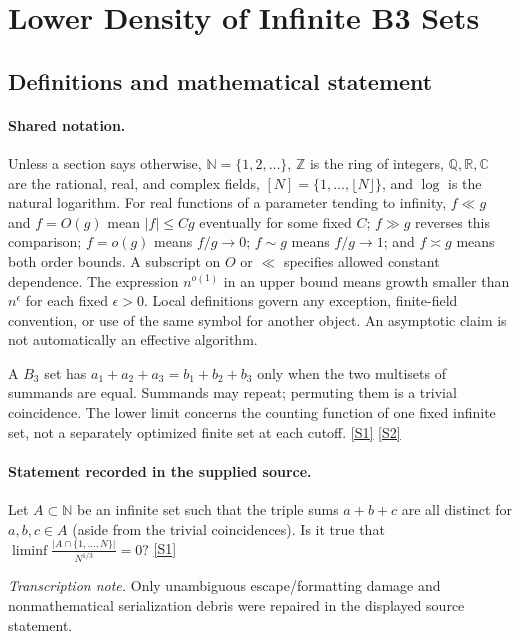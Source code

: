 \documentclass[11pt,a4paper]{article}
\newcommand{\N}{\mathbb{N}}
\newcommand{\Z}{\mathbb{Z}}
\newcommand{\Q}{\mathbb{Q}}
\newcommand{\R}{\mathbb{R}}
\newcommand{\C}{\mathbb{C}}
\newcommand{\sref}[2]{\hyperlink{source:#1:#2}{[S#2]}}
\begin{document}
\section{Lower Density of Infinite B3 Sets}\label{statement}


\subsection{Definitions and mathematical statement}

\paragraph{Shared notation.}Unless a section says otherwise, $\N=\{1,2,\ldots\}$,
$\Z$ is the ring of integers, $\Q,\R,\C$ are the rational, real, and complex
fields, $[N]=\{1,\ldots,\lfloor N\rfloor\}$, and $\log$ is the natural
logarithm. For real functions of a parameter tending to infinity,
$f\ll g$ and $f=O(g)$ mean $|f|\leq Cg$ eventually for some fixed $C$;
$f\gg g$ reverses this comparison; $f=o(g)$ means $f/g\to0$;
$f\sim g$ means $f/g\to1$; and $f\asymp g$ means both order bounds.
A subscript on $O$ or $\ll$ specifies allowed constant dependence.
The expression $n^{o(1)}$ in an upper bound means growth smaller than
$n^\epsilon$ for each fixed $\epsilon>0$. Local definitions govern any
exception, finite-field convention, or use of the same symbol for another
object. An asymptotic claim is not automatically an effective algorithm.



A $B_3$ set has $a_1+a_2+a_3=b_1+b_2+b_3$ only when the two multisets of summands are equal. Summands may repeat; permuting them is a trivial coincidence. The lower limit concerns the counting function of one fixed infinite set, not a separately optimized finite set at each cutoff. \sref{statement}{1} \sref{statement}{2}

\paragraph{Statement recorded in the supplied source.}
Let $A\subset\mathbb{N}$ be an infinite set such that the triple sums $a+b+c$ are all distinct for $a,b,c\in A$ (aside from the trivial coincidences). Is it true that $ \liminf \frac{\lvert A\cap \{1,\ldots,N\}\rvert}{N^{1/3}}=0? $ \sref{statement}{1}

{\small\emph{Transcription note.} Only unambiguous escape/formatting damage and nonmathematical serialization debris were repaired in the displayed source statement.}
\end{document}

